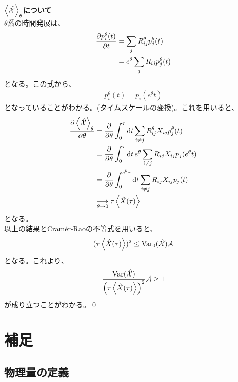 \documentclass[a4paper,11pt]{jsarticle}
\numberwithin{equation}{section}
\begin{document}
\textbf{$\ev{\hat{\mathcal{X}}}_{\theta}$について}\\
$\theta$系の時間発展は、
\begin{align}
    \pdv{p_i^{\theta}(t)}{t} &= \sum_{j} R_{ij}^{\theta}p_j^{\theta} (t)\\
    &= e^{\theta} \sum_{j} R_{ij}p_j^{\theta} (t)
\end{align}
となる。この式から、
\begin{align}
    p_i^{\theta}(t) = p_i(e^{\theta}t)
\end{align}
となっていることがわかる。(タイムスケールの変換)。これを用いると、
\begin{align}
    \pdv{\ev{\hat{\mathcal{X}}}_{\theta}}{\theta} &= \pdv{\theta}\int_{0}^{\tau} \dd{t} \sum_{i \neq j} R_{ij}^{\theta} X_{ij}p_j^{\theta}(t)\\
    &= \pdv{\theta}\int_{0}^{\tau} \dd{t} e^{\theta} \sum_{i \neq j} R_{ij} X_{ij}p_j(e^{\theta}t)\\
    &= \pdv{\theta}\int_{0}^{e^{\theta}\tau} \dd{t} \sum_{i \neq j} R_{ij} X_{ij}p_j(t)\\
    &\underset{\theta \to 0}{\longrightarrow} \tau \ev{\hat{X}(\tau)}
\end{align}
となる。\\
以上の結果とCram\'er-Raoの不等式を用いると、
\begin{align}
    (\tau \ev{\hat{X}(\tau)})^2 \leq \text{Var}_0(\hat{\mathcal{X}}) \mathcal{A}
\end{align}
となる。これより、
\begin{align}
    \frac{\text{Var}(\hat{\mathcal{X}})}{\qty(\tau \ev{\hat{X}(\tau)})^2} \mathcal{A} \geq 1
\end{align}
が成り立つことがわかる。\qed

\newpage
\section{補足}
\subsection{物理量の定義}
\end{document}
